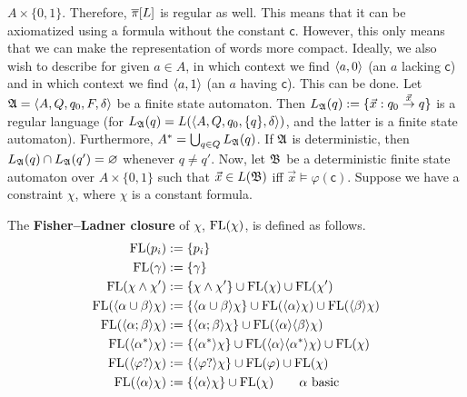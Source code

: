 $A \times \{0,1\}$. Therefore, $\overline{\pi}[L]$ is regular as well.
This means that it can be axiomatized using a formula without the
constant $\mathsf{c}$. However, this only means that we can make the
representation of words more compact. Ideally, we also wish to describe
for given $a \in A$, in which context we find $\langle a, 0\rangle$ (an
$a$ lacking $\mathsf{c}$) and in which context we find $\langle a, 1\rangle$
(an $a$ having $\mathsf{c}$).  This can be done. Let $\mathfrak{A} =
\langle A, Q, q_0, F, \delta\rangle$ be a finite state automaton.
Then $L_{\mathfrak{A}}(q) := \{\vec{x} : q_0 \stackrel{\vec{x}}{\rightarrow} q\}$
is a regular language (for $L_{\mathfrak{A}}(q) = L(\langle A, Q, q_0,
\{q\}, \delta\rangle)$, and the latter is a finite state automaton).
Furthermore, $A^{\ast} = \bigcup_{q \in Q} L_{\mathfrak{A}}(q)$.
If $\mathfrak{A}$ is deterministic, then $L_{\mathfrak{A}}(q) \cap L_{\mathfrak{A}}(q') 
= \varnothing$ whenever $q \neq q'$. Now, let $\mathfrak{B}$ be a 
deterministic finite state automaton over $A \times \{0,1\}$ such 
that $\vec{x} \in L(\mathfrak{B})$ iff $\vec{x} \vDash \varphi(\mathsf{c})$.
Suppose we have a constraint $\chi$, where $\chi$ is a constant
formula.
\begin{defn}
The \textbf{Fisher--Ladner closure} 
\index{$\FL(\chi)$}%
of $\chi$, $\FL(\chi)$, is defined as follows.
\begin{subequations}
\begin{align}
\operatorname{FL}(p_i) & := \{p_i\} \\
\operatorname{FL}(\gamma) & := \{\gamma\} \\
\operatorname{FL}(\chi\wedge\chi') & := \{\chi\wedge\chi'\}
        \cup \operatorname{FL}(\chi) \cup \operatorname{FL}(\chi') \\
\operatorname{FL}(\langle \alpha\cup \beta\rangle\chi) & :=
        \{\langle\alpha\cup\beta\rangle\chi\}
        \cup \operatorname{FL}(\langle\alpha\rangle\chi)
        \cup \operatorname{FL}(\langle\beta\rangle\chi) \\
\operatorname{FL}(\langle \alpha;\beta\rangle\chi) & :=
        \{\langle\alpha;\beta\rangle\chi\}
        \cup \operatorname{FL}(\langle\alpha\rangle\langle\beta\rangle\chi) \\
\operatorname{FL}(\langle \alpha^{\ast}\rangle\chi) & :=
        \{\langle \alpha^{\ast}\rangle\chi\} \cup
        \operatorname{FL}(\langle \alpha\rangle\langle\alpha^{\ast}\rangle\chi)
	\cup \operatorname{FL}(\chi) \\
\operatorname{FL}(\langle \varphi?\rangle\chi) & :=
        \{\langle\varphi?\rangle\chi\} \cup
        \operatorname{FL}(\varphi) \cup \operatorname{FL}(\chi) \\
\operatorname{FL}(\langle \alpha\rangle\chi) & :=
        \{\langle\alpha\rangle\chi\} \cup
        \operatorname{FL}(\chi) \qquad \alpha \mbox{ basic}
\end{align}
\end{subequations}
\end{defn}

